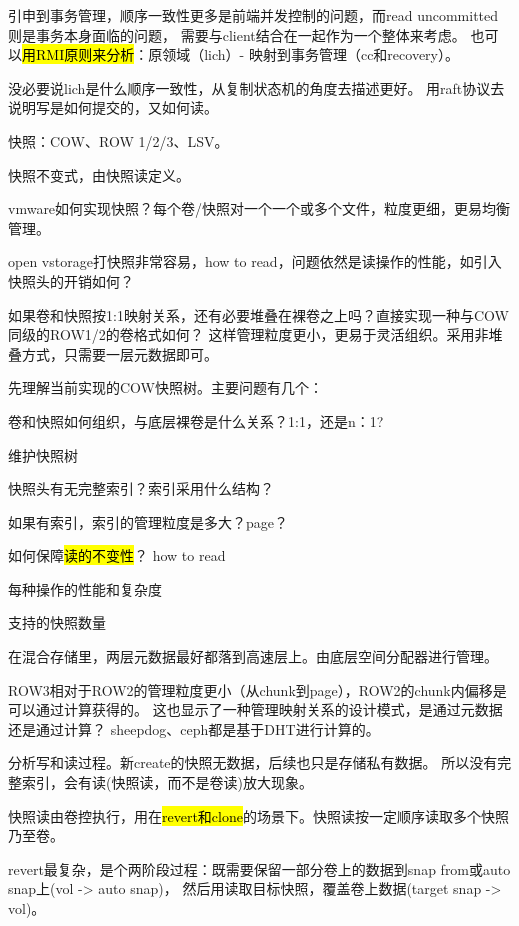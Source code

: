 引申到事务管理，顺序一致性更多是前端并发控制的问题，而read uncommitted则是事务本身面临的问题，
需要与client结合在一起作为一个整体来考虑。
也可以\hl{用RMI原则来分析}：原领域（lich）- 映射到事务管理（cc和recovery）。

没必要说lich是什么顺序一致性，从复制状态机的角度去描述更好。
用raft协议去说明写是如何提交的，又如何读。

\hrulefill

快照：COW、ROW 1/2/3、LSV。

快照不变式，由快照读定义。

vmware如何实现快照？每个卷/快照对一个一个或多个文件，粒度更细，更易均衡管理。

open vstorage打快照非常容易，how to read，问题依然是读操作的性能，如引入快照头的开销如何？

如果卷和快照按1:1映射关系，还有必要堆叠在裸卷之上吗？直接实现一种与COW同级的ROW1/2的卷格式如何？
这样管理粒度更小，更易于灵活组织。采用非堆叠方式，只需要一层元数据即可。

先理解当前实现的COW快照树。主要问题有几个：
\begin{enumbox}
\item 卷和快照如何组织，与底层裸卷是什么关系？1:1，还是n：1?
\item 维护快照树
\item 快照头有无完整索引？索引采用什么结构？
\item 如果有索引，索引的管理粒度是多大？page？
\item 如何保障\hl{读的不变性}？ how to read
\item 每种操作的性能和复杂度
\item 支持的快照数量
\end{enumbox}

在混合存储里，两层元数据最好都落到高速层上。由底层空间分配器进行管理。

ROW3相对于ROW2的管理粒度更小（从chunk到page），ROW2的chunk内偏移是可以通过计算获得的。
这也显示了一种管理映射关系的设计模式，{是通过元数据还是通过计算}？
sheepdog、ceph都是基于DHT进行计算的。

分析写和读过程。新create的快照无数据，后续也只是存储私有数据。
所以没有完整索引，会有读(快照读，而不是卷读)放大现象。

快照读由卷控执行，用在\hl{revert和clone}的场景下。快照读按一定顺序读取多个快照乃至卷。

revert最复杂，是个两阶段过程：既需要保留一部分卷上的数据到snap from或auto snap上(vol -> auto snap)，
然后用读取目标快照，覆盖卷上数据(target snap -> vol)。

